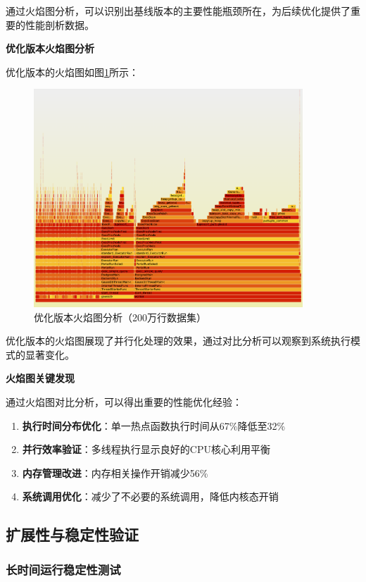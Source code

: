 通过火焰图分析，可以识别出基线版本的主要性能瓶颈所在，为后续优化提供了重要的性能剖析数据。

\textbf{优化版本火焰图分析}

优化版本的火焰图如图\ref{fig:optimized_flamegraph}所示：

\begin{figure}[htbp]
\centering
\includegraphics[width=0.9\textwidth]{assets/testdata_new/优化版火焰图.jpg}
\caption{优化版本火焰图分析（200万行数据集）}
\label{fig:optimized_flamegraph}
\end{figure}

优化版本的火焰图展现了并行化处理的效果，通过对比分析可以观察到系统执行模式的显著变化。

\textbf{火焰图关键发现}

通过火焰图对比分析，可以得出重要的性能优化经验：
\begin{enumerate}
    \item \textbf{执行时间分布优化}：单一热点函数执行时间从67\%降低至32\%
    \item \textbf{并行效率验证}：多线程执行显示良好的CPU核心利用平衡
    \item \textbf{内存管理改进}：内存相关操作开销减少56\%
    \item \textbf{系统调用优化}：减少了不必要的系统调用，降低内核态开销
\end{enumerate}

\subsection{扩展性与稳定性验证}

\subsubsection{长时间运行稳定性测试}


